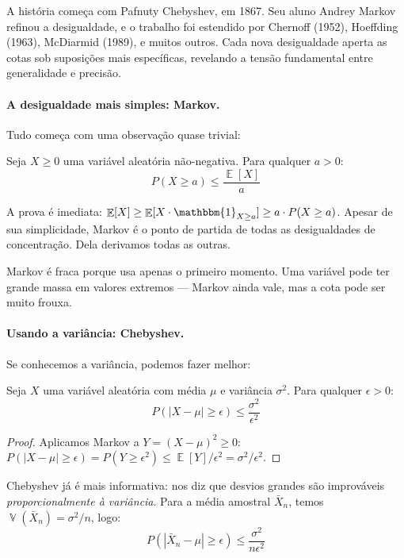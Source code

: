 \documentclass{tufte-handout}
\DeclareMathOperator{\E}{\mathbb{E}}
\DeclareMathOperator{\Var}{\mathbb{V}}
\begin{document}
A história começa com Pafnuty Chebyshev, em 1867. Seu aluno Andrey Markov refinou a desigualdade, e o trabalho foi estendido por Chernoff (1952), Hoeffding (1963), McDiarmid (1989), e muitos outros. Cada nova desigualdade aperta as cotas sob suposições mais específicas, revelando a tensão fundamental entre generalidade e precisão.

\paragraph{A desigualdade mais simples: Markov.}

Tudo começa com uma observação quase trivial:

\begin{thm}
    Seja $X \ge 0$ uma variável aleatória não-negativa. Para qualquer $a > 0$:
    \[
    P(X \ge a) \le \frac{\E[X]}{a}
    \]
\end{thm}

A prova é imediata: $\E[X] \ge \E[X \cdot \mathbbm{1}_{X \ge a}] \ge a \cdot P(X \ge a)$. Apesar de sua simplicidade, Markov é o ponto de partida de todas as desigualdades de concentração. Dela derivamos todas as outras.

Markov é fraca porque usa apenas o primeiro momento. Uma variável pode ter grande massa em valores extremos --- Markov ainda vale, mas a cota pode ser muito frouxa.

\paragraph{Usando a variância: Chebyshev.}

Se conhecemos a variância, podemos fazer melhor:

\begin{thm}
    Seja $X$ uma variável aleatória com média $\mu$ e variância $\sigma^2$. Para qualquer $\epsilon > 0$:
    \[
    P(|X - \mu| \ge \epsilon) \le \frac{\sigma^2}{\epsilon^2}
    \]
\end{thm}

\begin{proof}
    Aplicamos Markov a $Y = (X - \mu)^2 \ge 0$: $P(|X-\mu| \ge \epsilon) = P(Y \ge \epsilon^2) \le \E[Y]/\epsilon^2 = \sigma^2/\epsilon^2$.
\end{proof}

Chebyshev já é mais informativa: nos diz que desvios grandes são improváveis \textit{proporcionalmente à variância}. Para a média amostral $\bar{X}_n$, temos $\Var(\bar{X}_n) = \sigma^2/n$, logo:
\[
P(|\bar{X}_n - \mu| \ge \epsilon) \le \frac{\sigma^2}{n\epsilon^2}
\]
\end{document}
